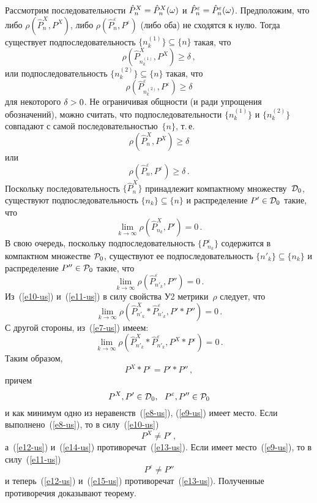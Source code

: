 \begin{multicols}{2}
Рассмотрим последовательности $\hat P_n^X\hm=\hat P_n^X(\omega)$ и
$\hat P_n^\varepsilon\hm=\hat P_n^\varepsilon(\omega)$. Предположим,
что либо $\rho(\hat P_n^X,P^X)$, либо
$\rho(\hat P_n^\varepsilon,P^\varepsilon)$ (либо оба)
не сходятся к нулю. Тогда существует подпоследовательность
$\{n_k^{(1)}\}\subseteq\{n\}$
такая, что
$$
\rho\left(\hat P^X_{n_k^{(1)}},P^X\right)\ge\delta\,,
$$
или подпоследовательность
$\{n_k^{(2)}\}\subseteq\{n\}$ такая, что
$$
\rho\left(\hat P^\varepsilon_{n_k^{(2)}},P^\varepsilon\right)\ge\delta
$$
для некоторого $\delta\hm>0$.
Не ограничивая общности (и ради упрощения обозначений), можно
считать, что подпоследовательности $\{n_k^{(1)}\}$ и $\{n_k^{(2)}\}$
совпадают с самой
последовательностью~$\{n\}$, т.\,е.\
\begin{equation}
\rho\left(\hat P^X_n,P^X\right)\ge\delta\label{e8-us}
\end{equation}
или
\begin{equation}
\rho\left(\hat P^\varepsilon_n,P^\varepsilon\right)\ge\delta\,.
\label{e9-us}
\end{equation}
Поскольку последовательность $\{\hat P_n^X\}$ принадлежит компактному
множеству~${\cal D}_0$, существуют подпоследовательность
$\{n_k\}\subseteq\{n\}$ и распределение $P'\in{\cal D}_0$
такие, что
\begin{equation}
\lim\limits_{k\to\infty}\rho\left(\hat P^X_{n_k},P'\right)=0\,.\label{e10-us}
\end{equation}
В свою очередь, поскольку подпоследовательность
$\{P^\varepsilon_{n_k}\}$
содержится в компактном множестве ${\cal P}_0$, существуют ее
подпоследовательность $\{n'_k\}\subseteq\{n_k\}$ и
распределение $P''\in{\cal P}_0$ такие, что
\begin{equation}
\lim\limits_{k\to\infty}\rho\left(\hat P^\varepsilon_{n'_k},P''\right)=0\,.\label{e11-us}
\end{equation}
Из~(\ref{e10-us}) и~(\ref{e11-us}) в силу свойства У2 мет\-ри\-ки~$\rho$ следует, что
$$
\lim\limits_{k\to\infty}
\rho\left(\hat P^X_{n'_k}\ast\hat P^\varepsilon_{n'_k},P'\ast P''\right)=0\,.
$$
С другой стороны, из~(\ref{e7-us}) имеем:
$$
\lim\limits_{k\to\infty}
\rho\left(\hat P^X_{n'_k}\ast\hat P^\varepsilon_{n'_k},P^X\ast P^\varepsilon\right)=0\,.
$$
Таким образом,
\begin{equation}
P^X\ast P^\varepsilon=P'\ast P''\,,\label{e12-us}
\end{equation}
причем
\begin{equation}
P^X,P'\in{\cal D}_0,\ \
P^\varepsilon,P''\in{\cal P}_0\label{e13-us}
\end{equation}
и как минимум одно из неравенств~(\ref{e8-us}), (\ref{e9-us}) имеет место. Если
выполнено~(\ref{e8-us}), то в силу~(\ref{e10-us})
\begin{equation}
P^X\not=P'\,,\label{e14-us}
\end{equation}
а~(\ref{e12-us}) и~(\ref{e14-us}) противоречат~(\ref{e13-us}). 
Если имеет место~(\ref{e9-us}), то в силу~(\ref{e11-us})
\begin{equation}
P^\varepsilon\not=P''\label{e15-us}
\end{equation}
и теперь~(\ref{e12-us}) и~(\ref{e15-us}) противоречат~(\ref{e13-us}). 
Полученные противоречия доказывают теорему.


\end{multicols}
